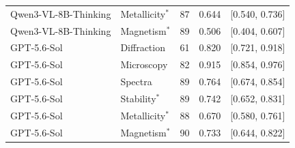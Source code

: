 \documentclass[11pt]{article}
\begin{document}
\begin{table}[h]
{\begin{tabular}{l l S[table-format=3.0] S[table-format=1.3] c}
Qwen3-VL-8B-Thinking & Metallicity$^{*}$ & 87 & 0.644 & [0.540, 0.736] \\
Qwen3-VL-8B-Thinking & Magnetism$^{*}$ & 89 & 0.506 & [0.404, 0.607] \\
\addlinespace
GPT-5.6-Sol & Diffraction & 61 & 0.820 & [0.721, 0.918] \\
GPT-5.6-Sol & Microscopy & 82 & 0.915 & [0.854, 0.976] \\
GPT-5.6-Sol & Spectra & 89 & 0.764 & [0.674, 0.854] \\
GPT-5.6-Sol & Stability$^{*}$ & 89 & 0.742 & [0.652, 0.831] \\
GPT-5.6-Sol & Metallicity$^{*}$ & 88 & 0.670 & [0.580, 0.761] \\
GPT-5.6-Sol & Magnetism$^{*}$ & 90 & 0.733 & [0.644, 0.822] \\
\bottomrule
\end{tabular}}
\end{table}
\end{document}
